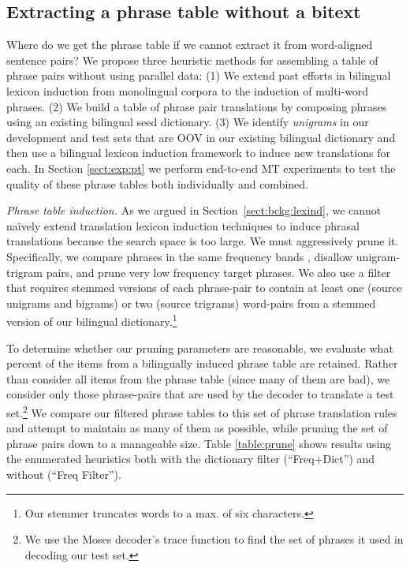 \documentclass[11pt]{article}
\newcommand{\mtodo}[1]{}
\newcommand{\todo}[1]{\textcolor{red}{TODO: #1}}
\newcommand{\secref}[1]{Section~\ref{#1}}
\newcommand{\paraheader}[1]{\vskip 0.05in \noindent\emph{#1}}
\begin{document}
\subsection{Extracting a phrase table without a bitext}  \label{sect:extract}
Where do we get the phrase table if we cannot extract it from word-aligned sentence pairs? We propose three heuristic methods for assembling a table of phrase pairs without using parallel data: (1) We extend past efforts in bilingual lexicon induction from monolingual corpora to the induction of multi-word phrases. (2) We build a table of phrase pair translations by composing phrases using an existing bilingual seed dictionary. (3) We identify \emph {unigrams} in our development and test sets that are OOV in our existing bilingual dictionary and then use a bilingual lexicon induction framework to induce new translations for each. In Section \ref{sect:exp:pt} we perform end-to-end MT experiments to test the quality of these phrase tables both individually and combined.

\paraheader{Phrase table induction.} As we argued in \secref{sect:bckg:lexind}, we cannot na\"{i}vely extend translation lexicon induction techniques to induce phrasal translations because the search space is too large. We must aggressively prune it.   Specifically, we compare phrases in the same frequency bands \cite{Uszkoreit:2010}, disallow unigram-trigram pairs, and prune very low frequency target phrases. We also use a filter that requires stemmed versions of each phrase-pair to contain at least one (source unigrams and bigrams) or two (source trigrams) word-pairs from a stemmed version of our bilingual dictionary.\footnote{Our stemmer truncates words to a max. of six characters.} %

To determine whether our pruning parameters are reasonable, we evaluate what percent of the items from a bilingually induced phrase table are retained.  Rather than consider all items from the phrase table (since many of them are bad), we consider only those phrase-pairs that are used by the decoder to translate a test set.\footnote{We use the Moses decoder's trace function to find the set of phrases it used in decoding our test set.} We compare our filtered phrase tables to this set of phrase translation rules and attempt to maintain as many of them as possible, while pruning the set of phrase pairs down to a manageable size. Table \ref{table:prune} shows results using the enumerated heuristics both with the dictionary filter (``Freq+Dict'') and without (``Freq Filter'').
\end{document}
